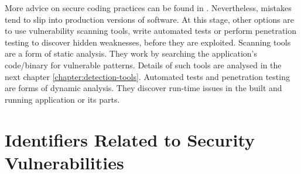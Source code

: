   \bigskip

  More advice on secure coding practices can be found in \cite{SecureCodingPractices}. Nevertheless, mistakes
  tend to slip into production versions of software. At this stage, other options are to use vulnerability
  scanning tools, write automated tests or perform penetration testing to discover hidden weaknesses, before
  they are exploited. Scanning tools are a form of static analysis. They work by searching the application's code/binary
  for vulnerable patterns. Details of such tools are analysed in the next chapter \ref{chapter:detection-tools}.
  Automated tests and penetration testing are forms of dynamic analysis. They discover run-time issues
  in the built and running application or its parts.


  \section{Identifiers Related to Security Vulnerabilities}

